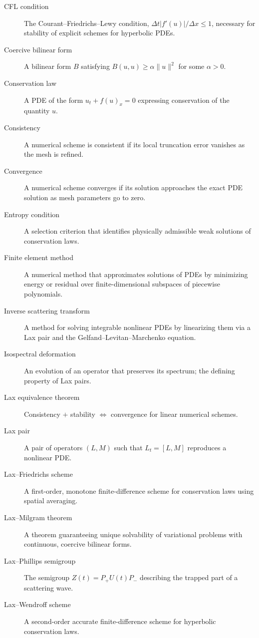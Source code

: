 \begin{description}
    \item[CFL condition] The Courant--Friedrichs--Lewy condition, \(\Delta t |f'(u)| / \Delta x \leq 1\), necessary for stability of explicit schemes for hyperbolic PDEs.
    \item[Coercive bilinear form] A bilinear form \(B\) satisfying \(B(u,u) \geq \alpha \|u\|^2\) for some \(\alpha > 0\).
    \item[Conservation law] A PDE of the form \(u_t + f(u)_x = 0\) expressing conservation of the quantity \(u\).
    \item[Consistency] A numerical scheme is consistent if its local truncation error vanishes as the mesh is refined.
    \item[Convergence] A numerical scheme converges if its solution approaches the exact PDE solution as mesh parameters go to zero.
    \item[Entropy condition] A selection criterion that identifies physically admissible weak solutions of conservation laws.
    \item[Finite element method] A numerical method that approximates solutions of PDEs by minimizing energy or residual over finite-dimensional subspaces of piecewise polynomials.
    \item[Inverse scattering transform] A method for solving integrable nonlinear PDEs by linearizing them via a Lax pair and the Gelfand--Levitan--Marchenko equation.
    \item[Isospectral deformation] An evolution of an operator that preserves its spectrum; the defining property of Lax pairs.
    \item[Lax equivalence theorem] Consistency \(+\) stability \(\Longleftrightarrow\) convergence for linear numerical schemes.
    \item[Lax pair] A pair of operators \((L,M)\) such that \(L_t = [L,M]\) reproduces a nonlinear PDE.
    \item[Lax--Friedrichs scheme] A first-order, monotone finite-difference scheme for conservation laws using spatial averaging.
    \item[Lax--Milgram theorem] A theorem guaranteeing unique solvability of variational problems with continuous, coercive bilinear forms.
    \item[Lax--Phillips semigroup] The semigroup \(Z(t) = P_+ U(t) P_-\) describing the trapped part of a scattering wave.
    \item[Lax--Wendroff scheme] A second-order accurate finite-difference scheme for hyperbolic conservation laws.

\end{description}

